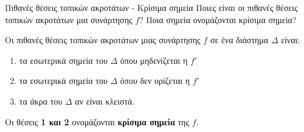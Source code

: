 \begin{Orismosbox}{Πιθανές θέσεις τοπικών ακροτάτων - Κρίσιμα σημεία}
\label{orismos:krisima_shmeia}
Ποιες είναι οι πιθανές θέσεις τοπικών ακροτάτων μια συνάρτησης $f$? Ποια σημεία ονομάζονται κρίσιμα σημεία?
\end{Orismosbox}
\apanthsh
Οι πιθανές θέσεις τοπικών ακροτάτων μιας συνάρτησης $f$ σε ένα διάστημα $\varDelta$ είναι:
\begin{enumerate}
\item τα εσωτερικά σημεία του $\varDelta$ όπου μηδενίζεται η $f'$
\item τα εσωτερικά σημεία του $\varDelta$ όπου δεν ορίζεται η $f'$
\item τα άκρα του $\varDelta$ αν είναι κλειστά.
\end{enumerate}
Οι θέσεις \textbf{1 και 2} ονομάζονται \textbf{κρίσιμα σημεία} της $f$.

